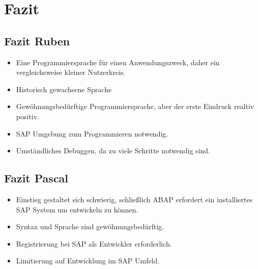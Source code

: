 \section{Fazit}

\subsection{Fazit Ruben}
\begin{itemize}
    \item Eine Programmiersprache für einen Anwendungszweck, daher ein vergleichsweise kleiner Nutzerkreis.
    \item Historisch gewachsene Sprache
    \item Gewöhnungsbedürftige Programmiersprache, aber der erste Eindruck realtiv positiv.
    \item SAP Umgebung zum Programmieren notwendig.
    \item Umständliches Debuggen, da zu viele Schritte notwendig sind.
\end{itemize}
\subsection{Fazit Pascal}
\begin{itemize}
    \item Einstieg gestaltet sich schwierig, schließlich ABAP erfordert ein installiertes SAP System um entwickeln zu können.
    \item Syntax und Sprache sind gewöhnungsbedürftig.
    \item Registrierung bei SAP als Entwickler erforderlich.
    \item Limitierung auf Entwicklung im SAP Umfeld.
\end{itemize}

\newpage
